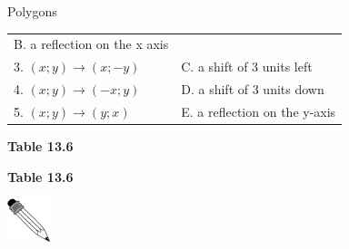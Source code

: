 \begin{exercises}{Polygons}
\begin{table}[H]
\begin{center}
\begin{xtabular}[t]{|l|l|}
    
        B. a reflection on the x axis%
     \tabularnewline{}
    
    
        3.
                    $\left(x;y\right)\to \left(x;-y\right)$
                   &
    
    
        C. a shift of 3 units left%
     \tabularnewline{}
    
    
        4.
                    $\left(x;y\right)\to \left(-x;y\right)$
                   &
    
    
        D. a shift of 3 units down%
     \tabularnewline{}
    
    
        
5.
                    $\left(x;y\right)\to \left(y;x\right)$
                   &
    
    
        E. a reflection on the y-axis%
     \tabularnewline{}
    \end{xtabular}
      \end{center}
    \begin{center}{\small\bfseries Table 13.6}\end{center}
    \begin{caption}{\small\bfseries Table 13.6}\end{caption}
\end{table}
      
    \par
  
\par
            \label{m39357*secfhsst!!!underscore!!!id147}\vspace{.5cm} 
      
      \noindent
      \hspace*{-30pt}\includegraphics[width=0.5in]{col11306.imgs/pspencil2.png}   
\end{exercises}
